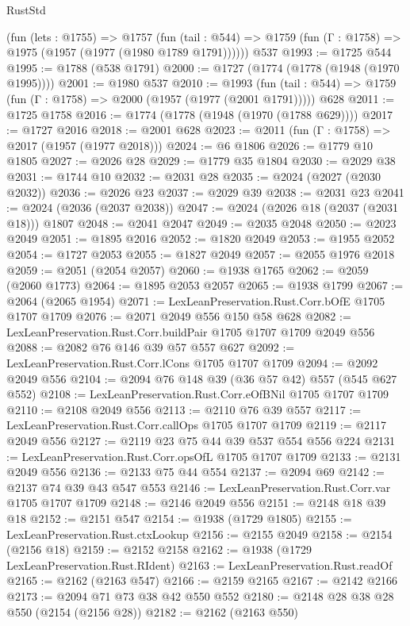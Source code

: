 \begin{lexlean}{RustStd}
\begin{coremodule}
    (fun (lets : @1755) =>
    @1757
      (fun (tail : @544) => @1759 (fun (Γ : @1758) => @1975 (@1957 (@1977 (@1980 @1789 @1791))))))
    @537
@1993 := @1725 @544
@1995 := @1788 (@538 @1791)
@2000 := @1727 (@1774 (@1778 (@1948 (@1970 @1995))))
@2001 := @1980 @537
@2010 := @1993
    (fun (tail : @544) => @1759 (fun (Γ : @1758) => @2000 (@1957 (@1977 (@2001 @1791)))))
    @628
@2011 := @1725 @1758
@2016 := @1774 (@1778 (@1948 (@1970 (@1788 @629))))
@2017 := @1727 @2016
@2018 := @2001 @628
@2023 := @2011 (fun (Γ : @1758) => @2017 (@1957 (@1977 @2018)))
@2024 := @6 @1806
@2026 := @1779 @10 @1805
@2027 := @2026 @28
@2029 := @1779 @35 @1804
@2030 := @2029 @38
@2031 := @1744 @10
@2032 := @2031 @28
@2035 := @2024 (@2027 (@2030 @2032))
@2036 := @2026 @23
@2037 := @2029 @39
@2038 := @2031 @23
@2041 := @2024 (@2036 (@2037 @2038))
@2047 := @2024 (@2026 @18 (@2037 (@2031 @18))) @1807
@2048 := @2041 @2047
@2049 := @2035 @2048
@2050 := @2023 @2049
@2051 := @1895 @2016
@2052 := @1820 @2049
@2053 := @1955 @2052
@2054 := @1727 @2053
@2055 := @1827 @2049
@2057 := @2055 @1976 @2018
@2059 := @2051 (@2054 @2057)
@2060 := @1938 @1765
@2062 := @2059 (@2060 @1773)
@2064 := @1895 @2053 @2057
@2065 := @1938 @1799
@2067 := @2064 (@2065 @1954)
@2071 := LexLeanPreservation.Rust.Corr.bOfE @1705 @1707 @1709
@2076 := @2071 @2049 @556 @150 @58 @628
@2082 := LexLeanPreservation.Rust.Corr.buildPair @1705 @1707 @1709 @2049 @556
@2088 := @2082 @76 @146 @39 @57 @557 @627
@2092 := LexLeanPreservation.Rust.Corr.lCons @1705 @1707 @1709
@2094 := @2092 @2049 @556
@2104 := @2094 @76 @148 @39 (@36 @57 @42) @557 (@545 @627 @552)
@2108 := LexLeanPreservation.Rust.Corr.eOfBNil @1705 @1707 @1709
@2110 := @2108 @2049 @556
@2113 := @2110 @76 @39 @557
@2117 := LexLeanPreservation.Rust.Corr.callOps @1705 @1707 @1709
@2119 := @2117 @2049 @556
@2127 := @2119 @23 @75 @44 @39 @537 @554 @556 @224
@2131 := LexLeanPreservation.Rust.Corr.opsOfL @1705 @1707 @1709
@2133 := @2131 @2049 @556
@2136 := @2133 @75 @44 @554
@2137 := @2094 @69
@2142 := @2137 @74 @39 @43 @547 @553
@2146 := LexLeanPreservation.Rust.Corr.var @1705 @1707 @1709
@2148 := @2146 @2049 @556
@2151 := @2148 @18 @39 @18
@2152 := @2151 @547
@2154 := @1938 (@1729 @1805)
@2155 := LexLeanPreservation.Rust.ctxLookup
@2156 := @2155 @2049
@2158 := @2154 (@2156 @18)
@2159 := @2152 @2158
@2162 := @1938 (@1729 LexLeanPreservation.Rust.RIdent)
@2163 := LexLeanPreservation.Rust.readOf
@2165 := @2162 (@2163 @547)
@2166 := @2159 @2165
@2167 := @2142 @2166
@2173 := @2094 @71 @73 @38 @42 @550 @552
@2180 := @2148 @28 @38 @28 @550 (@2154 (@2156 @28))
@2182 := @2162 (@2163 @550)

\end{coremodule}
\end{lexlean}
